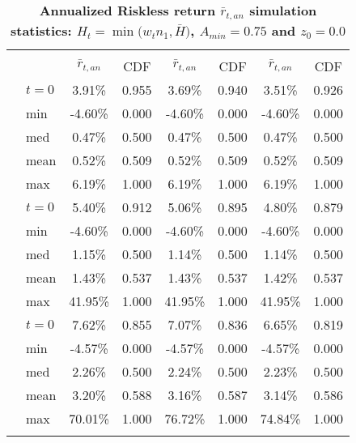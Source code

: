 \documentclass[letterpaper,12pt]{article}
\theoremstyle{definition}
\begin{document}
\begin{spacing}{1.5}
  \begin{table}[htbp]\centering\captionsetup{width=4.6in}
  \caption{\label{TabRiskl_A75}\textbf{Annualized Riskless return $\bar{r}_{t,an}$ simulation statistics: $H_t=\min\bigl(w_t n_1, \bar{H}\bigr)$, $A_{min}=0.75$ and $z_0=0.0$}}
    \begin{threeparttable}
    \begin{tabular}{>{\small}c >{\small}l| >{\small}c >{\small}c| >{\small}c >{\small}c| >{\small}c >{\small}c}
      \hline\hline
      & & \multicolumn{2}{c}{$k_{2,0}=0.11$} & \multicolumn{2}{c}{$k_{2,0}=0.14$} & \multicolumn{2}{c}{$k_{2,0}=0.17$} \\ \cline{3-8}
      & & $\bar{r}_{t,an}$ & CDF & $\bar{r}_{t,an}$ & CDF & $\bar{r}_{t,an}$ & CDF \\
      \hline
      \multirow{5}{*}{$\bar{H}=0.00$}
      & $t=0$ & 3.91\% & 0.955 & 3.69\% & 0.940 & 3.51\% & 0.926 \\
      & min & -4.60\% & 0.000 & -4.60\% & 0.000 & -4.60\% & 0.000 \\
      & med & 0.47\% & 0.500 & 0.47\% & 0.500 & 0.47\% & 0.500 \\
      & mean & 0.52\% & 0.509 & 0.52\% & 0.509 & 0.52\% & 0.509 \\
      & max & 6.19\% & 1.000 & 6.19\% & 1.000 & 6.19\% & 1.000 \\
      \hline
      \multirow{5}{*}{$\bar{H}=0.05$}
      & $t=0$ & 5.40\% & 0.912 & 5.06\% & 0.895 & 4.80\% & 0.879 \\
      & min & -4.60\% & 0.000 & -4.60\% & 0.000 & -4.60\% & 0.000 \\
      & med & 1.15\% & 0.500 & 1.14\% & 0.500 & 1.14\% & 0.500 \\
      & mean & 1.43\% & 0.537 & 1.43\% & 0.537 & 1.42\% & 0.537 \\
      & max & 41.95\% & 1.000 & 41.95\% & 1.000 & 41.95\% & 1.000 \\
      \hline
      \multirow{5}{*}{$\bar{H}=0.11$}
      & $t=0$ & 7.62\% & 0.855 & 7.07\% & 0.836 & 6.65\% & 0.819 \\
      & min & -4.57\% & 0.000 & -4.57\% & 0.000 & -4.57\% & 0.000 \\
      & med & 2.26\% & 0.500 & 2.24\% & 0.500 & 2.23\% & 0.500 \\
      & mean & 3.20\% & 0.588 & 3.16\% & 0.587 & 3.14\% & 0.586 \\
      & max & 70.01\% & 1.000 & 76.72\% & 1.000 & 74.84\% & 1.000 \\
      \hline
      \multirow{5}{*}{$\bar{H}=0.17$}

\end{tabular}
\end{threeparttable}
\end{table}
\end{spacing}
\end{document}
